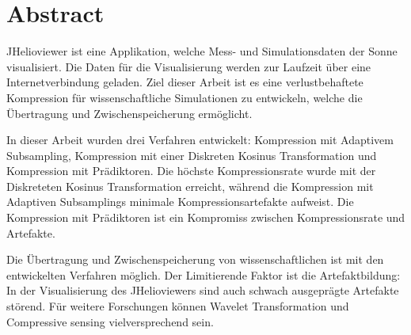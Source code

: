\section*{Abstract}
JHelioviewer ist eine Applikation, welche Mess- und Simulationsdaten der Sonne visualisiert. Die Daten für die Visualisierung werden zur Laufzeit über eine Internetverbindung geladen. Ziel dieser Arbeit ist es eine verlustbehaftete Kompression für wissenschaftliche Simulationen zu entwickeln, welche die Übertragung und Zwischenspeicherung ermöglicht.

In dieser Arbeit wurden drei Verfahren entwickelt: Kompression mit Adaptivem Subsampling, Kompression mit einer Diskreten Kosinus Transformation und Kompression mit Prädiktoren. Die höchste Kompressionsrate wurde mit der Diskreteten Kosinus Transformation erreicht, während die Kompression mit Adaptiven Subsamplings minimale Kompressionsartefakte aufweist. Die Kompression mit Prädiktoren ist ein Kompromiss zwischen Kompressionsrate und Artefakte.

Die Übertragung und Zwischenspeicherung von wissenschaftlichen ist mit den entwickelten Verfahren möglich. Der Limitierende Faktor ist die Artefaktbildung: In der Visualisierung des JHelioviewers sind auch schwach ausgeprägte Artefakte störend. Für weitere Forschungen können Wavelet Transformation und Compressive sensing vielversprechend sein.
